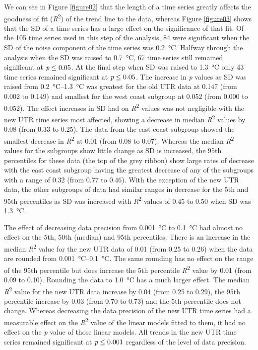 \documentclass{ametsoc}
\begin{document}
We can see in Figure \ref{figure02} that the length of a time series greatly affects the goodness of fit (\emph{R}\textsuperscript{2}) of the trend line to the data, whereas Figure \ref{figure03} shows that the SD of a time series has a large effect on the significance of that fit. Of the 105 time series used in this step of the analysis, 84 were significant when the SD of the noise component of the time series was \SI{0.2}{\degreeCelsius}. Halfway through the analysis when the SD was raised to \SI{0.7}{\degreeCelsius}, 67 time series still remained significant at $\emph{p} \leq 0.05$. At the final step when SD was raised to \SI{1.3}{\degreeCelsius} only 43 time series remained significant at $\emph{p} \leq 0.05$. The increase in \emph{p} values as SD was raised from \SIrange{0.2}{1.3}{\degreeCelsius} was greatest for the old UTR data at 0.147 (from 0.002 to 0.149) and smallest for the west coast subgroup at 0.052 (from 0.000 to 0.052). The effect increases in SD had on \emph{R}\textsuperscript{2} values was not negligible with the new UTR time series most affected, showing a decrease in median \emph{R}\textsuperscript{2} values by 0.08 (from 0.33 to 0.25). The data from the east coast subgroup showed the smallest decrease in \emph{R}\textsuperscript{2} at 0.01 (from 0.08 to 0.07). Whereas the median \emph{R}\textsuperscript{2} values for the subgroups show little change as SD is increased, the 95th percentiles for these data (the top of the grey ribbon) show large rates of decrease with the east coast subgroup having the greatest decrease of any of the subgroups with a range of 0.32 (from 0.77 to 0.46). With the exception of the new UTR data, the other subgroups of data had similar ranges in decrease for the 5th and 95th percentiles as SD was increased with \emph{R}\textsuperscript{2} values of 0.45 to 0.50 when SD was \SI{1.3}{\degreeCelsius}.

The effect of decreasing data precision from \SI{0.001}{\degreeCelsius} to \SI{0.1}{\degreeCelsius} had almost no effect on the 5th, 50th (median) and 95th percentiles. There is an increase in the median \emph{R}\textsuperscript{2} value for the new UTR data of 0.01 (from 0.25 to 0.26) when the data are rounded from \SIrange{0.001}{0.1}{\degreeCelsius}. The same rounding has no effect on the range of the 95th percentile but does increase the 5th percentile \emph{R}\textsuperscript{2} value by 0.01 (from 0.09 to 0.10). Rounding the data to \SI{1.0}{\degreeCelsius} has a much larger effect. The median \emph{R}\textsuperscript{2} value for the new UTR data increase by 0.04 (from 0.25 to 0.29), the 95th percentile increase by 0.03 (from 0.70 to 0.73) and the 5th percentile does not change. Whereas decreasing the data precision of the new UTR time series had a measurable effect on the \emph{R}\textsuperscript{2} value of the linear models fitted to them, it had no effect on the \emph{p} value of those linear models. All trends in the new UTR time series remained significant at $\emph{p} \leq 0.001$ regardless of the level of data precision.
\end{document}
